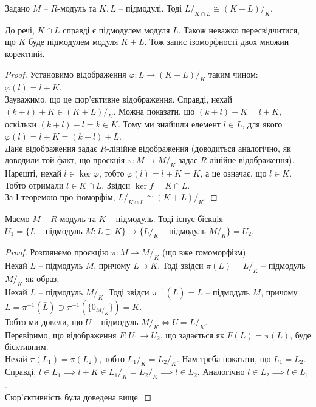 \documentclass{math_library}
\begin{document}
\begin{theorem}
Задано $M$ -- $R$-модуль та $K,L$ -- підмодулі. Тоді $L/_{K \cap L} \cong (K + L)/_K$.
\end{theorem}

\begin{remark}
До речі, $K \cap L$ справді є підмодулем модуля $L$. Також неважко пересвідчитися, що $K$ буде підмодулем модуля $K+L$. Тож запис ізоморфності двох множин коректний.
\end{remark}

\begin{proof}
Установимо відображення $\varphi \colon L \to (K+L)/_K$ таким чином:\\
$\varphi(l) = l+K$.\\
Зауважимо, що це сюр'єктивне відображення. Справді, нехай $(k+l) + K \in (K+L)/_K$. Можна показати, що $(k+l) + K = l+K$, оскільки $(k+l) - l = k \in K$. Тому ми знайшли елемент $l \in L$, для якого $\varphi(l) = l+K = (k+l) + L$.\\
Дане відображення задає $R$-лінійне відображення (доводиться аналогічно, як доводили той факт, що проєкція $\pi \colon M \to M/_K$ задає $R$-лінійне відображення).\\
Нарешті, нехай $l \in \ker \varphi$, тобто $\varphi(l) = l + K = K$, а це означає, що $l \in K$. Тобто отримали $l \in K \cap L$. Звідси $\ker f = K \cap L$.\\
За І теоремою про ізоморфім, $L/_{K \cap L} \cong (K + L)/_K$.
\end{proof}

\begin{theorem}
Маємо $M$ -- $R$-модуль та $K$ -- підмодуль. Тоді існує бієкція $U_1 = \{ L \text{ -- підмодуль } M: L \supset K \} \to \{ L/_K \text{ -- підмодуль } M/_K \} = U_2$.
\end{theorem}

\begin{proof}
Розглянемо проєкцію $\pi \colon M \to M/_K$ (що вже гомоморфізм).\\
Нехай $L$ -- підмодуль $M$, причому $L \supset K$. Тоді звідси $\pi(L) = L/_K$ -- підмодуль $M/_K$ як образ.\\
Нехай $\bar{L}$ -- підмодуль $M/_K$. Тоді звідси $\pi^{-1}(\bar{L}) = L$ -- підмодуль $M$, причому $L = \pi^{-1}(\bar{L}) \supset \pi^{-1}(\{0_{M/_K}\}) = K$. 
\bigskip \\
Тобто ми довели, що $U$ -- підмодуль $M/_K \iff U = L/_K$.\\
Перевіримо, що відображення $F \colon U_1 \to U_2$, що задається як $F(L) = \pi(L)$, буде бієктивним.\\
Нехай $\pi(L_1) = \pi(L_2)$, тобто ${L_1}/_K = {L_2}/_K$. Нам треба показати, що $L_1 = L_2$. Справді, $l \in L_1 \implies l+K \in {L_1}/_K = {L_2}/_K \implies l \in L_2$. Аналогічно $l \in L_2 \implies l \in L_1$.\\
Сюр'єктивність була доведена вище.
\end{proof}
\end{document}

